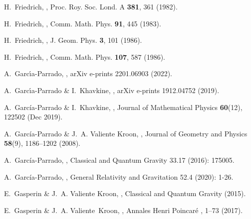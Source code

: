 \documentclass[10pt,a4paper]{article}
\theoremstyle{plain}
\begin{document}
\begin{thebibliography}{10}
H.~Friedrich,
,
\newblock Proc. Roy. Soc. Lond. A {\bf 381}, 361 (1982).

H.~Friedrich,
,
\newblock Comm. Math. Phys. {\bf 91}, 445 (1983).

H.~Friedrich,
,
\newblock J. Geom. Phys. {\bf 3}, 101 (1986).

H.~Friedrich,
,
\newblock Comm. Math. Phys. {\bf 107}, 587 (1986).

A.~Garc\'\i{}a-Parrado,
,
\newblock arXiv e-prints 2201.06903  (2022).

A.~Garc\'\i{}a-Parrado \& I.~Khavkine,
,
\newblock arXiv e-prints 1912.04752 (2019).

A.~García-Parrado \& I.~Khavkine,
,
\newblock Journal of Mathematical Physics {\bf 60}(12), 122502 (Dec 2019).

A.~García-Parrado \& J.~A. {Valiente Kroon},
,
\newblock Journal of Geometry and Physics {\bf 58}(9), 1186--1202 (2008).

A.~García-Parrado,
,
\newblock Classical and Quantum Gravity 33.17 (2016): 175005.

A.~García-Parrado,
,
\newblock General Relativity and Gravitation 52.4 (2020): 1-26.

E.~{Gasperin} \& J.~A. {Valiente Kroon},
,
\newblock Classical and Quantum Gravity  (2015).

E.~Gasperin \& J.~A. Valiente~Kroon,
,
\newblock Annales Henri Poincar{\'e} , 1--73 (2017).


\end{thebibliography}
\end{document}
